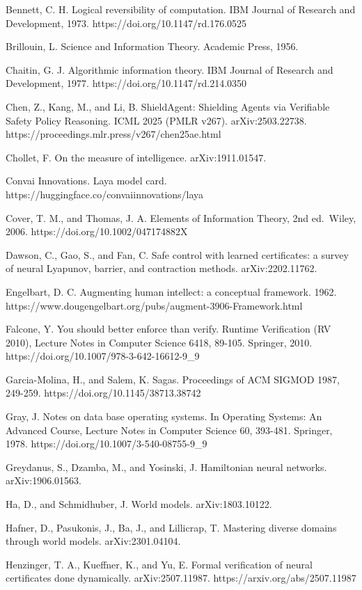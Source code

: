 \documentclass[
  10pt,
]{article}
\begin{document}
Bennett, C. H. Logical reversibility of computation. IBM Journal of
Research and Development, 1973. https://doi.org/10.1147/rd.176.0525

Brillouin, L. Science and Information Theory. Academic Press, 1956.

Chaitin, G. J. Algorithmic information theory. IBM Journal of Research
and Development, 1977. https://doi.org/10.1147/rd.214.0350

Chen, Z., Kang, M., and Li, B. ShieldAgent: Shielding Agents via
Verifiable Safety Policy Reasoning. ICML 2025 (PMLR v267).
arXiv:2503.22738. https://proceedings.mlr.press/v267/chen25ae.html

Chollet, F. On the measure of intelligence. arXiv:1911.01547.

Convai Innovations. Laya model card.
https://huggingface.co/convaiinnovations/laya

Cover, T. M., and Thomas, J. A. Elements of Information Theory, 2nd
ed.~Wiley, 2006. https://doi.org/10.1002/047174882X

Dawson, C., Gao, S., and Fan, C. Safe control with learned certificates:
a survey of neural Lyapunov, barrier, and contraction methods.
arXiv:2202.11762.

Engelbart, D. C. Augmenting human intellect: a conceptual framework.
1962. https://www.dougengelbart.org/pubs/augment-3906-Framework.html

Falcone, Y. You should better enforce than verify. Runtime Verification
(RV 2010), Lecture Notes in Computer Science 6418, 89-105. Springer,
2010. https://doi.org/10.1007/978-3-642-16612-9\_9

Garcia-Molina, H., and Salem, K. Sagas. Proceedings of ACM SIGMOD 1987,
249-259. https://doi.org/10.1145/38713.38742

Gray, J. Notes on data base operating systems. In Operating Systems: An
Advanced Course, Lecture Notes in Computer Science 60, 393-481.
Springer, 1978. https://doi.org/10.1007/3-540-08755-9\_9

Greydanus, S., Dzamba, M., and Yosinski, J. Hamiltonian neural networks.
arXiv:1906.01563.

Ha, D., and Schmidhuber, J. World models. arXiv:1803.10122.

Hafner, D., Pasukonis, J., Ba, J., and Lillicrap, T. Mastering diverse
domains through world models. arXiv:2301.04104.

Henzinger, T. A., Kueffner, K., and Yu, E. Formal verification of neural
certificates done dynamically. arXiv:2507.11987.
https://arxiv.org/abs/2507.11987
\end{document}
